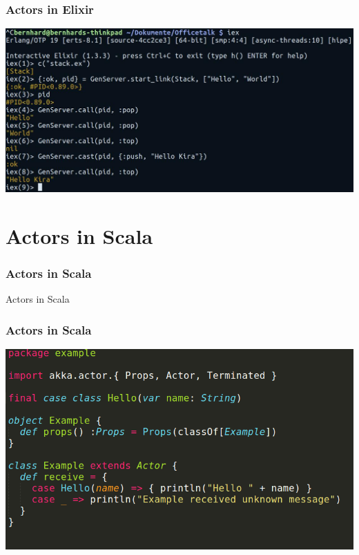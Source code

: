 \documentclass{beamer}
\begin{document}

\begin{frame}
\frametitle{Actors in Elixir}
\includegraphics[width=1.25\linewidth]{./GenServerTerminal.jpg}
\end{frame}


\section{Actors in Scala}

\begin{frame}
\frametitle{Actors in Scala}
\Huge{\centerline{Actors in Scala}}
\end{frame}



\begin{frame}
\frametitle{Actors in Scala}
\includegraphics[width=1\linewidth]{./scala_example_actor.png}
\end{frame}

\end{document}
